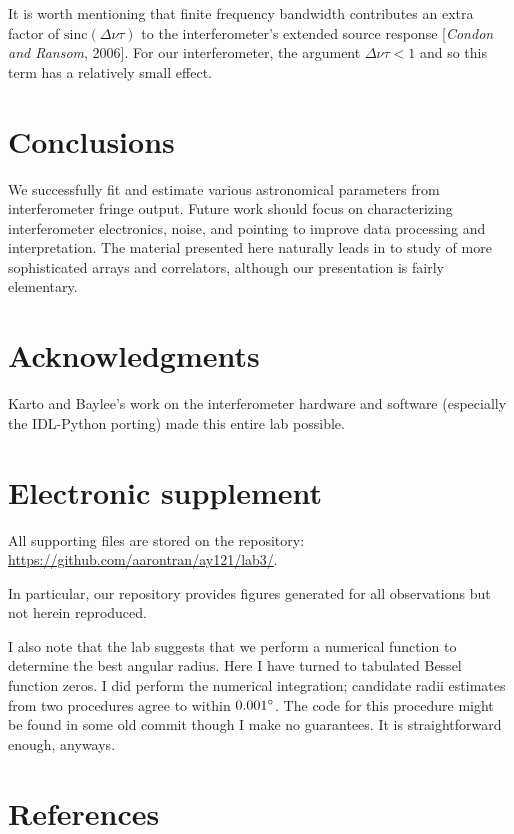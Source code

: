 \documentclass[10pt]{article}
\begin{document}
It is worth mentioning that finite frequency bandwidth contributes an extra factor of $\mathrm{sinc} (\Delta\nu\tau)$ to the interferometer's extended source response [\textit{Condon and Ransom}, 2006].  For our interferometer, the argument $\Delta\nu\tau < 1$ and so this term has a relatively small effect.

\section{Conclusions}

We successfully fit and estimate various astronomical parameters from interferometer fringe output.  Future work should focus on characterizing interferometer electronics, noise, and pointing to improve data processing and interpretation.  The material presented here naturally leads in to study of more sophisticated arrays and correlators, although our presentation is fairly elementary.

\section{Acknowledgments}

Karto and Baylee's work on the interferometer hardware and software (especially the IDL-Python porting) made this entire lab possible.

\section{Electronic supplement}

All supporting files are stored on the repository:\\
\href{https://github.com/aarontran/ay121}
{https://github.com/aarontran/ay121/lab3/}.

In particular, our repository provides figures generated for all observations but not herein reproduced.

I also note that the lab suggests that we perform a numerical function to determine the best angular radius.  Here I have turned to tabulated Bessel function zeros.  I did perform the numerical integration; candidate radii estimates from two procedures agree to within $0.001\degree$.  The code for this procedure might be found in some old commit though I make no guarantees.  It is straightforward enough, anyways.

\section{References}
\end{document}
